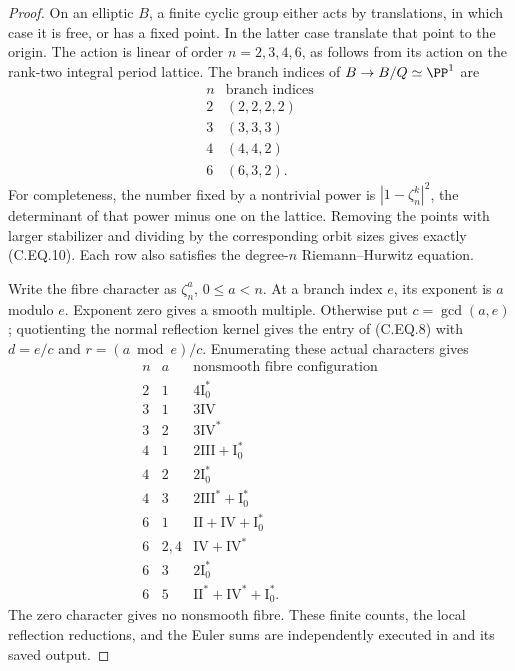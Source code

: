 \begin{proof}
On an elliptic $B$, a finite cyclic group either
acts by translations, in which case it is free,
or has a fixed point. In the latter case translate
that point to the origin. The action is linear of
order $n=2,3,4,6$, as follows from its action on
the rank-two integral period lattice. The branch
indices of $B\to B/Q\simeq\PP^1$ are
\[
\begin{array}{c|c}
n&\text{branch indices}\\ \hline
2&(2,2,2,2)\\
3&(3,3,3)\\
4&(4,4,2)\\
6&(6,3,2).
\end{array}                                                   \tag{C.EQ.10}
\]
For completeness, the number fixed by a nontrivial
power is $|1-\zeta_n^k|^2$, the determinant of
that power minus one on the lattice. Removing
the points with larger stabilizer and dividing
by the corresponding orbit sizes gives exactly
(C.EQ.10). Each row also satisfies the degree-$n$
Riemann--Hurwitz equation.

Write the fibre character as $\zeta_n^a$,
$0\le a<n$. At a branch index $e$, its exponent
is $a$ modulo $e$. Exponent zero gives a smooth
multiple. Otherwise put $c=\gcd(a,e)$; quotienting
the normal reflection kernel gives the entry of
(C.EQ.8) with $d=e/c$ and $r=(a\bmod e)/c$.
Enumerating these actual characters gives
\[
\begin{array}{c|c|l}
n&a&\text{nonsmooth fibre configuration}\\ \hline
2&1&4\mathrm I_0^*\\
3&1&3\mathrm{IV}\\
3&2&3\mathrm{IV}^*\\
4&1&2\mathrm{III}+\mathrm I_0^*\\
4&2&2\mathrm I_0^*\\
4&3&2\mathrm{III}^*+\mathrm I_0^*\\
6&1&\mathrm{II}+\mathrm{IV}+\mathrm I_0^*\\
6&2,4&\mathrm{IV}+\mathrm{IV}^*\\
6&3&2\mathrm I_0^*\\
6&5&\mathrm{II}^*+\mathrm{IV}^*+\mathrm I_0^* .
\end{array}                                                   \tag{C.EQ.11}
\]
The zero character gives no nonsmooth fibre.
These finite counts, the local reflection reductions,
and the Euler sums are independently executed in
 and its
saved output.


\end{proof}
